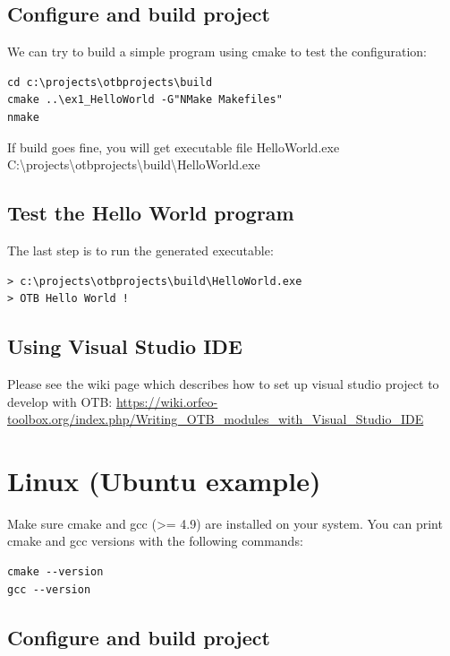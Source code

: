 \documentclass[10pt,a4paper]{article}
\begin{document}
\subsection{Configure and build project}

We can try to build a simple program using cmake to test the
configuration:

\begin{verbatim}
cd c:\projects\otbprojects\build
cmake ..\ex1_HelloWorld -G"NMake Makefiles"
nmake
\end{verbatim}
If build goes fine, you will get executable file HelloWorld.exe
\newline
C:{\textbackslash}projects{\textbackslash}otbprojects{\textbackslash}build{\textbackslash}HelloWorld.exe
\newline

\subsection{Test the Hello World program}

The last step is to run the generated executable:

\begin{verbatim}
> c:\projects\otbprojects\build\HelloWorld.exe
> OTB Hello World !
\end{verbatim}

\subsection{Using Visual Studio IDE}\label{ide}

Please see the wiki page which describes how to set up visual studio project to
develop with OTB:
\url{https://wiki.orfeo-toolbox.org/index.php/Writing_OTB_modules_with_Visual_Studio_IDE}

\clearpage
\section{Linux (Ubuntu example)}

Make sure cmake and gcc (>= 4.9) are installed on your system. You can
print cmake and gcc versions with the following commands: 

\begin{verbatim}
cmake --version
gcc --version
\end{verbatim}

\subsection{Configure and build project}
\end{document}

